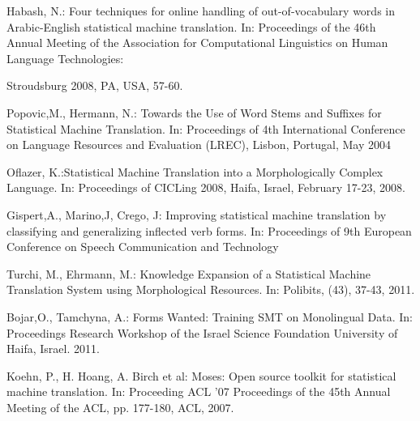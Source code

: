 \documentclass[11pt,letterpaper]{article}
\begin{document}
\begin{thebibliography}{4} 


 Habash, N.: Four techniques for online handling of out-of-vocabulary words in 
Arabic-English statistical machine translation. In: Proceedings of the 46th Annual Meeting of 
the Association for Computational Linguistics on Human Language Technologies:

Stroudsburg 2008, PA, USA, 57-60.

 Popovic,M., Hermann, N.: Towards the Use of Word Stems and Suffixes for Statistical Machine Translation. 
In: Proceedings of 4th International Conference on Language Resources and Evaluation (LREC), Lisbon, Portugal, May 2004 

 Oflazer, K.:Statistical Machine Translation into a Morphologically Complex Language. 
In: Proceedings of CICLing 2008, Haifa, Israel, February 17-23, 2008. 

 Gispert,A., Marino,J, Crego, J: Improving statistical machine translation by classifying and generalizing inflected verb forms.  
In: Proceedings of 9th European Conference on Speech Communication and Technology

 Turchi, M., Ehrmann, M.: Knowledge Expansion of a Statistical Machine Translation System using Morphological Resources. 
In: Polibits, (43), 37-43, 2011.

 Bojar,O., Tamchyna, A.: Forms Wanted: Training SMT on Monolingual Data.
In: Proceedings Research Workshop of the Israel Science Foundation University of Haifa, Israel. 2011.

Koehn, P., H. Hoang, A. Birch et al: Moses: Open source toolkit for statistical machine translation.
In: Proceeding ACL '07 Proceedings of the 45th Annual Meeting of the ACL, pp. 177-180, ACL, 2007.

\end{thebibliography}
\end{document}
